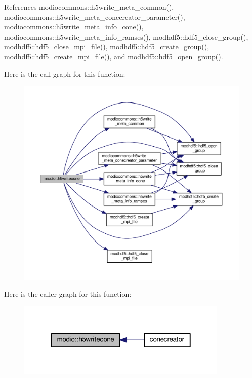 References modiocommons\-::h5write\-\_\-meta\-\_\-common(), modiocommons\-::h5write\-\_\-meta\-\_\-conecreator\-\_\-parameter(), modiocommons\-::h5write\-\_\-meta\-\_\-info\-\_\-cone(), modiocommons\-::h5write\-\_\-meta\-\_\-info\-\_\-ramses(), modhdf5\-::hdf5\-\_\-close\-\_\-group(), modhdf5\-::hdf5\-\_\-close\-\_\-mpi\-\_\-file(), modhdf5\-::hdf5\-\_\-create\-\_\-group(), modhdf5\-::hdf5\-\_\-create\-\_\-mpi\-\_\-file(), and modhdf5\-::hdf5\-\_\-open\-\_\-group().



Here is the call graph for this function\-:\nopagebreak
\begin{figure}[H]
\begin{center}
\leavevmode
\includegraphics[width=350pt]{classmodio_a756eae4b92791daadf54d68094c44c8b_cgraph}
\end{center}
\end{figure}




Here is the caller graph for this function\-:\nopagebreak
\begin{figure}[H]
\begin{center}
\leavevmode
\includegraphics[width=286pt]{classmodio_a756eae4b92791daadf54d68094c44c8b_icgraph}
\end{center}
\end{figure}


